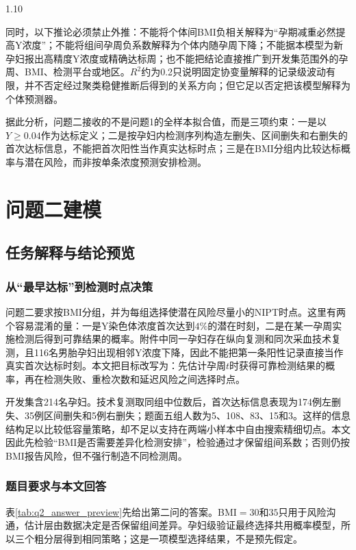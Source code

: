 \documentclass[12pt,a4paper]{ctexrep}
\numberwithin{equation}{section}
\begin{document}
\begin{spacing}{1.10}
{			同时，以下推论必须禁止外推：不能将个体间BMI负相关解释为“孕期减重必然提高Y浓度”；不能将组间孕周负系数解释为个体内随孕周下降；不能据本模型为新孕妇报出高精度Y浓度或精确达标周；也不能把结论直接推广到开发集范围外的孕周、BMI、检测平台或地区。$R^2$约为0.2只说明固定协变量解释的记录级波动有限，并不否定经过聚类稳健推断后得到的关系方向；但它足以否定把该模型解释为个体预测器。

			据此分析，问题二接收的不是问题1的全样本拟合值，而是三项约束：一是以$Y\geq0.04$作为达标定义；二是按孕妇内检测序列构造左删失、区间删失和右删失的首次达标信息，不能把首次阳性当作真实达标时点；三是在BMI分组内比较达标概率与潜在风险，而非按单条浓度预测安排检测。
			
			\section{问题二建模}
			\subsection{任务解释与结论预览}
			\subsubsection{从“最早达标”到检测时点决策}
			问题二要求按BMI分组，并为每组选择使潜在风险尽量小的NIPT时点。这里有两个容易混淆的量：一是Y染色体浓度首次达到$4\%$的潜在时刻，二是在某一孕周实施检测后得到可靠结果的概率。附件中同一孕妇存在纵向复测和同次采血技术复测，且116名男胎孕妇出现相邻Y浓度下降，因此不能把第一条阳性记录直接当作真实首次达标时刻。本文把目标改写为：先估计孕周$t$时获得可靠检测结果的概率，再在检测失败、重检次数和延迟风险之间选择时点。

			开发集含214名孕妇。技术复测取同组中位数后，首次达标信息表现为174例左删失、35例区间删失和5例右删失；题面五组人数为5、108、83、15和3。这样的信息结构足以比较低容量策略，却不足以支持在两端小样本中自由搜索精细切点。本文因此先检验“BMI是否需要差异化检测安排”，检验通过才保留组间系数；否则仍按BMI报告风险，但不强行制造不同检测周。

			\subsubsection{题目要求与本文回答}
			表\ref{tab:q2_answer_preview}先给出第二问的答案。BMI$=30$和$35$只用于风险沟通，估计层由数据决定是否保留组间差异。孕妇级验证最终选择共用概率模型，所以三个粗分层得到相同策略；这是一项模型选择结果，不是预先假定。

}
\end{spacing}
\end{document}
